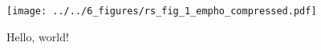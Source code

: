 \kant[0]

\begin{wrapfigure}{r}{0.33\textwidth}
    \begin{center}
        \texttt{[image: ../../6\_figures/rs\_fig\_1\_empho\_compressed.pdf]}
    \end{center}
    \caption{Hello, world!}
\end{wrapfigure}

\kant[1]